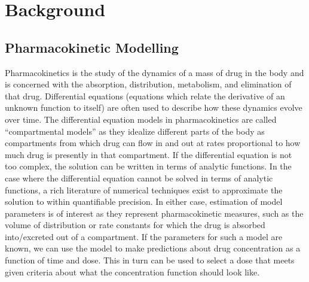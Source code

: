 \section{Background}
\subsection*{Pharmacokinetic Modelling}

Pharmacokinetics is the study of the dynamics of a mass of drug in the body and is concerned with the absorption, distribution, metabolism, and elimination of that drug.  Differential equations (equations which relate the derivative of an unknown function to itself) are often used to describe how these dynamics evolve over time. The differential equation models in pharmacokinetics are called “compartmental models” as they idealize different parts of the body as compartments from which drug can flow in and out at rates proportional to how much drug is presently in that compartment. If the differential equation is not too complex, the solution can be written in terms of analytic functions.  In the case where the differential equation cannot be solved in terms of analytic functions, a rich literature of numerical techniques exist to approximate the solution to within quantifiable precision. In either case, estimation of model parameters is of  interest as they represent pharmacokinetic measures, such as the volume of distribution or rate constants for which the drug is absorbed into/excreted out of a compartment. If the parameters for such a model are known, we can use the model to make predictions about drug concentration as a function of time and dose. This in turn can be used to select a dose that meets given criteria about what the concentration function should look like.

